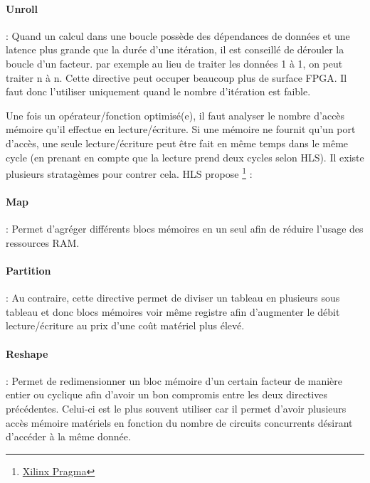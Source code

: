 \documentclass[12pt,a4paper]{article}
\begin{document}
\paragraph{Unroll} : Quand un calcul dans une boucle possède des dépendances de données et une latence plus grande que la durée d'une itération, il est conseillé de dérouler la boucle d'un facteur. par exemple au lieu de traiter les données 1 à 1, on peut traiter n à n. Cette directive peut occuper beaucoup plus de surface FPGA. Il faut donc l'utiliser uniquement quand le nombre d'itération est faible.

Une fois un opérateur/fonction optimisé(e), il faut analyser le nombre d'accès mémoire qu'il effectue en lecture/écriture. Si une mémoire ne fournit qu'un port d'accès, une seule lecture/écriture peut être fait en même temps dans le même cycle (en prenant en compte que la lecture prend deux cycles selon HLS). Il existe plusieurs stratagèmes pour contrer cela. HLS propose \footnote{\href{https://japan.xilinx.com/html\_docs/xilinx2017\_4/sdaccel\_doc/okr1504034364623.html}{Xilinx Pragma}} :
\paragraph{Map} : Permet d'agréger différents blocs mémoires en un seul afin de réduire l'usage des ressources RAM.
\paragraph{Partition} : Au contraire, cette directive permet de diviser un tableau en plusieurs sous tableau et donc blocs mémoires voir même registre afin d'augmenter le débit lecture/écriture au prix d'une coût matériel plus élevé.
\paragraph{Reshape} : Permet de redimensionner un bloc mémoire d'un certain facteur de manière entier ou cyclique afin d'avoir un bon compromis entre les deux directives précédentes. Celui-ci est le plus souvent utiliser car il permet d'avoir plusieurs accès mémoire matériels en fonction du nombre de circuits concurrents désirant d'accéder à la même donnée.
\end{document}

